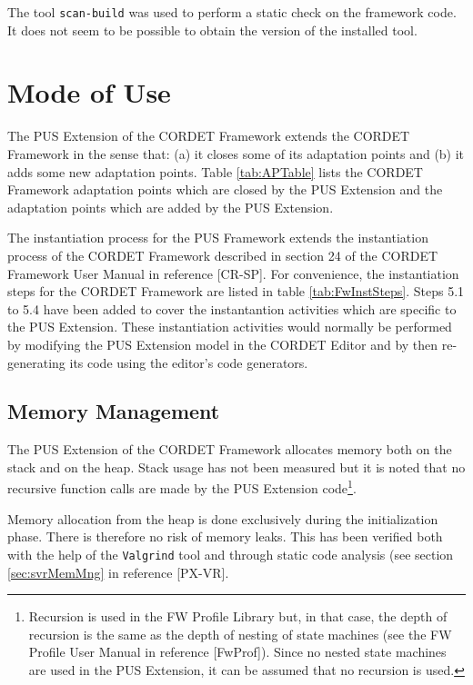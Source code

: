 \documentclass{pnp_article}
\begin{document}
The tool \texttt{scan-build} was used to perform a static check on the framework code. It does not seem to be possible to obtain the version of the installed tool.



\section{Mode of Use}\label{sec:umModeOfUse}
The PUS Extension of the CORDET Framework extends the CORDET Framework in the sense that: (a) it closes some of its adaptation points and (b) it adds some new adaptation points. Table \ref{tab:APTable} lists the CORDET Framework adaptation points which are closed by the PUS Extension and the adaptation points which are added by the PUS Extension.

The instantiation process for the PUS Framework extends the instantiation process of the CORDET Framework described in section 24 of the CORDET Framework User Manual in reference [CR-SP]. For convenience, the instantiation steps for the CORDET Framework are listed in table \ref{tab:FwInstSteps}. Steps 5.1 to 5.4 have been added to cover the instantantion activities which are specific to the PUS Extension. These instantiation activities would normally be performed by modifying the PUS Extension model in the CORDET Editor and by then re-generating its code using the editor's code generators.

\subsection{Memory Management}
The PUS Extension of the CORDET Framework allocates memory both on the stack and on the heap. Stack usage has not been measured but it is noted that no recursive function calls are made by the PUS Extension code\footnote{Recursion is used in the FW Profile Library but, in that case, the depth of recursion is the same as the depth of nesting of state machines (see the FW Profile User Manual in reference [FwProf]). Since no nested state machines are used in the PUS Extension, it can be assumed that no recursion is used.}.

Memory allocation from the heap is done exclusively during the initialization phase. There is therefore no risk of memory leaks. This has been verified both with the help of the \texttt{Valgrind} tool and through static code analysis (see section \ref{sec:svrMemMng} in reference [PX-VR]. 
\end{document}
